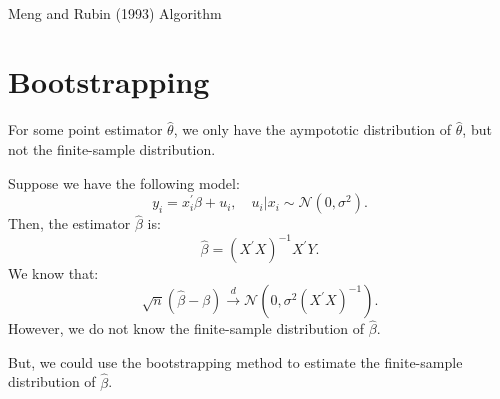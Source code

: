 \begin{note}
    \

    \begin{algorithm}[H]
        \caption{Meng and Rubin (1993) Algorithm}
        \SetAlgoLined
        
        
    \end{algorithm}
\end{note}

\section{Bootstrapping}

For some point estimator $\hat{\theta}$, we only have the aympototic distribution of $\hat{\theta}$, but not the finite-sample distribution.

\begin{eg}
    Suppose we have the following model:
    \[
    y_i = x_i^{\prime} \beta + u_i, \quad u_i|x_i \sim \mathcal{N}(0, \sigma^2).
    \]
    Then, the estimator $\hat{\beta}$ is:
    \[
    \hat{\beta} = \left(X^{\prime}X\right)^{-1}X^{\prime}Y.
    \]
    We know that:
    \[
    \sqrt{n} \left(\hat{\beta} - \beta\right) \xrightarrow{d} \mathcal{N}\left(0, \sigma^2 \left(X^{\prime}X\right)^{-1}\right).
    \]
    However, we do not know the finite-sample distribution of $\hat{\beta}$.
\end{eg}

But, we could use the bootstrapping method to estimate the finite-sample distribution of $\hat{\beta}$.

